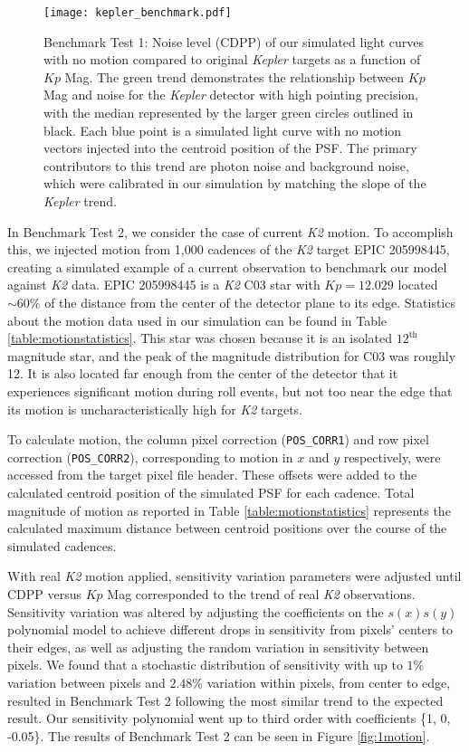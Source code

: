 \documentclass[12pt,preprint]{aastex}
\begin{document}
\begin{figure}[h]
	\centering
	\texttt{[image: kepler\_benchmark.pdf]}
	\caption{Benchmark Test 1: Noise level (CDPP) of our simulated light curves with no motion compared to original \textit{Kepler} targets as a function of $Kp$ Mag. The green trend demonstrates the relationship between $Kp$ Mag and noise for the \textit{Kepler} detector with high pointing precision, with the median represented by the larger green circles outlined in black. Each blue point is a simulated light curve with no motion vectors injected into the centroid position of the PSF. The primary contributors to this trend are photon noise and background noise, which were calibrated in our simulation by matching the slope of the \textit{Kepler} trend.}
	\label{fig:nomotion}
\end{figure}

In Benchmark Test 2, we consider the case of current \textit{K2} motion. To accomplish this, we injected motion from 1,000 cadences of the \textit{K2} target EPIC 205998445, creating a simulated example of a current observation to benchmark our model against \textit{K2} data. EPIC 205998445 is a \textit{K2} C03 star with $Kp = 12.029$ located ${\sim}60\%$ of the distance from the center of the detector plane to its edge. Statistics about the motion data used in our simulation can be found in Table \ref{table:motionstatistics}. This star was chosen because it is an isolated $12^{\text{th}}$ magnitude star, and the peak of the magnitude distribution for C03 was roughly 12. It is also located far enough from the center of the detector that it experiences significant motion during roll events, but not too near the edge that its motion is uncharacteristically high for \textit{K2} targets.

To calculate motion, the column pixel correction (\texttt{POS\_CORR1}) and row pixel correction (\texttt{POS\_CORR2}), corresponding to motion in $x$ and $y$ respectively, were accessed from the target pixel file header. These offsets were added to the calculated centroid position of the simulated PSF for each cadence. Total magnitude of motion as reported in Table \ref{table:motionstatistics} represents the calculated maximum distance between centroid positions over the course of the simulated cadences.

With real \textit{K2} motion applied, sensitivity variation parameters were adjusted until CDPP versus $Kp$ Mag corresponded to the trend of real \textit{K2} observations. Sensitivity variation was altered by adjusting the coefficients on the $s(x)s(y)$ polynomial model to achieve different drops in sensitivity from pixels' centers to their edges, as well as adjusting the random variation in sensitivity between pixels. We found that a stochastic distribution of sensitivity with up to $1\%$ variation between pixels and $2.48\%$ variation within pixels, from center to edge, resulted in Benchmark Test 2 following the most similar trend to the expected result. Our sensitivity polynomial went up to third order with coefficients \{1, 0, -0.05\}. The results of Benchmark Test 2 can be seen in Figure \ref{fig:1motion}.
\end{document}

